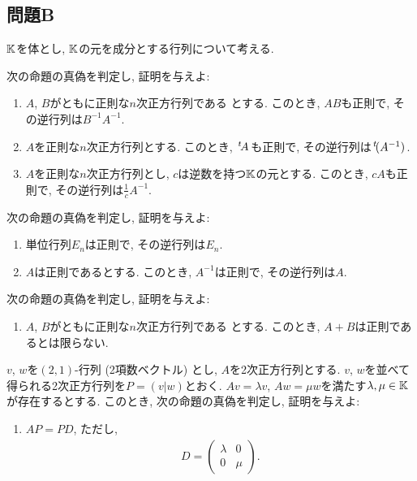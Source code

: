 \subsection{問題B}
$\mathbb{K}$を体とし, $\mathbb{K}$の元を成分とする行列について考える.

\begin{quiz}
  次の命題の真偽を判定し, 証明を与えよ:
  \begin{enumerate}
  \item
    $A$, $B$がともに正則な$n$次正方行列である
    とする.
    このとき, $AB$も正則で, その逆行列は$B^{-1}A^{-1}$.
  \item
    $A$を正則な$n$次正方行列とする.
    このとき, ${\left.^{t}\!A\right.}$も正則で, その逆行列は${\left.^{t}\!(A^{-1})\right.}$.
  \item
    $A$を正則な$n$次正方行列とし,
    $c$は逆数を持つ$\mathbb{K}$の元とする.
    このとき, $cA$も正則で, その逆行列は$\frac{1}{c}A^{-1}$.
  \end{enumerate}
\end{quiz}

\begin{quiz}
  次の命題の真偽を判定し, 証明を与えよ:
  \begin{enumerate}
  \item
    単位行列$E_n$は正則で, その逆行列は$E_n$.
  \item
    $A$は正則であるとする.
    このとき,
    $A^{-1}$は正則で, その逆行列は$A$.
  \end{enumerate}
\end{quiz}


\begin{quiz}
  次の命題の真偽を判定し, 証明を与えよ:
  \begin{enumerate}
  \item
    $A$, $B$がともに正則な$n$次正方行列である
    とする.
    このとき, $A+B$は正則であるとは限らない.
  \end{enumerate}
\end{quiz}

\begin{quiz}
  $v$, $w$を$(2,1)$-行列 (2項数ベクトル) とし,
  $A$を2次正方行列とする.
  $v$, $w$を並べて得られる2次正方行列を$P=(v|w)$とおく.
  $Av=\lambda v$, $Aw=\mu w$を満たす$\lambda,\mu\in\mathbb{K}$が存在するとする.
  このとき,
  次の命題の真偽を判定し, 証明を与えよ:
  \begin{enumerate}
  \item $AP=PD$, ただし,
    \begin{align*}
      D=\begin{pmatrix}\lambda&0\\0&\mu\end{pmatrix}.
    \end{align*}
  \end{enumerate}
\end{quiz}

